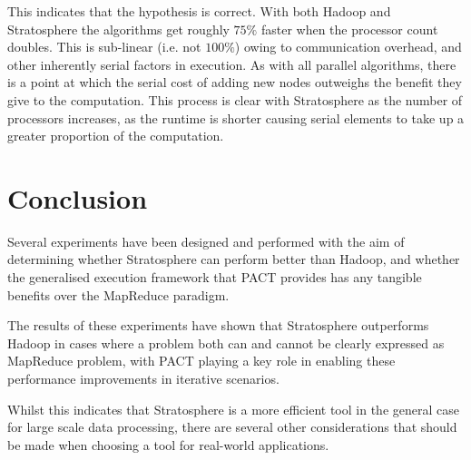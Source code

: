This indicates that the hypothesis is correct. With both Hadoop and Stratosphere the algorithms get roughly $75\%$ faster when the processor count doubles. This is sub-linear (i.e. not $100\%$) owing to communication overhead, and other inherently serial factors in execution. As with all parallel algorithms, there is a point at which the serial cost of adding new nodes outweighs the benefit they give to the computation. This process is clear with Stratosphere as the number of processors increases, as the runtime is shorter causing serial elements to take up a greater proportion of the computation.

\section{Conclusion}
Several experiments have been designed and performed with the aim of determining whether Stratosphere can perform better than Hadoop, and whether the generalised execution framework that PACT provides has any tangible benefits over the MapReduce paradigm. 

The results of these experiments have shown that Stratosphere outperforms Hadoop in cases where a problem both can and cannot be clearly expressed as MapReduce problem, with PACT playing a key role in enabling these performance improvements in iterative scenarios. 

Whilst this indicates that Stratosphere is a more efficient tool in the general case for large scale data processing, there are several other considerations that should be made when choosing a tool for real-world applications.